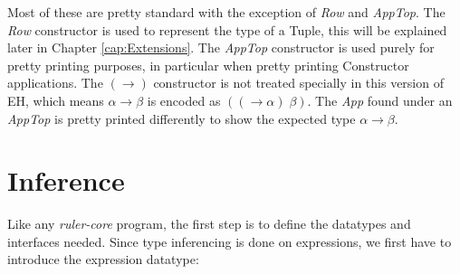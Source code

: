 \documentclass[twoside, titlepage, openright, a4paper]{book}
\newcommand{\rcore}{\emph{ruler-core }}
\begin{document}
Most of these are pretty standard with the exception of \emph{Row} and \emph{AppTop}. The \emph{Row} constructor is used to represent the type of a Tuple, this will be explained later in Chapter \ref{cap:Extensions}. 
The \emph{AppTop} constructor is used purely for pretty printing purposes, in particular when pretty printing Constructor applications. The \ensuremath{(\to )} constructor is not treated specially in this version of EH, which means \ensuremath{\alpha\to \beta} is encoded as \ensuremath{((\to \alpha)\;\beta)}. The \emph{App} found under an \emph{AppTop} is pretty printed differently to show the expected type \ensuremath{\alpha\to \beta}.

\section{Inference}
Like any \rcore program, the first step is to define the datatypes and interfaces needed. Since type inferencing is done on expressions, we first have to introduce the expression datatype:
\end{document}
